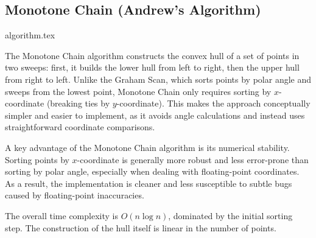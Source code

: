 \clearpage
\subsection{Monotone Chain (Andrew's Algorithm)}
\label{ssec:monotone_chain}

{algorithm.tex}

\begin{intuition}
The Monotone Chain algorithm constructs the convex hull of a set of points in two sweeps: first, it builds the lower hull from left to right, then the upper hull from right to left. Unlike the Graham Scan, which sorts points by polar angle and sweeps from the lowest point, Monotone Chain only requires sorting by $x$-coordinate (breaking ties by $y$-coordinate). This makes the approach conceptually simpler and easier to implement, as it avoids angle calculations and instead uses straightforward coordinate comparisons.
\end{intuition}

\begin{insight}
A key advantage of the Monotone Chain algorithm is its numerical stability. Sorting points by $x$-coordinate is generally more robust and less error-prone than sorting by polar angle, especially when dealing with floating-point coordinates. As a result, the implementation is cleaner and less susceptible to subtle bugs caused by floating-point inaccuracies.
\end{insight}



\begin{complexity}
\label{comp:monotone_chain}
The overall time complexity is $O(n \log n)$, dominated by the initial sorting step. The construction of the hull itself is linear in the number of points.
\end{complexity}